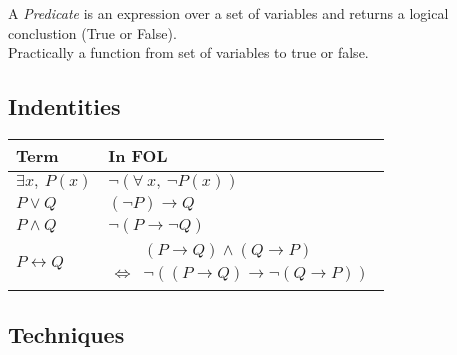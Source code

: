 \documentclass[11pt,a4paper]{article}
\begin{document}
A \textit{Predicate} is an expression over a set of variables and returns a logical conclustion (\ie True or False).\\
\nb Practically a function from set of variables to true or false.

\subsection{Indentities}

\begin{center}
\begin{tabular}{|l|l|}
\hline
\textbf{Term}&\textbf{In FOL}\\
\hline
$\exists x,\ P(x)$&$\neg(\forall\ x,\ \neg P(x))$\\
$P\vee Q$&$(\neg P)\to Q$\\
$P\wedge Q$&$\neg(P\to\neg Q)$\\
$P\leftrightarrow Q$&$\begin{array}{rl}&(P\to Q)\wedge(Q\to P)\\\Leftrightarrow&\neg((P\to Q)\to\neg(Q\to P))\end{array}$\\
\hline
\end{tabular}
\end{center}

\subsection{Techniques}

\end{document}
